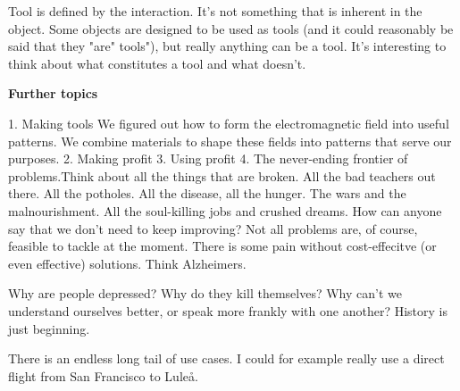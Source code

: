 \documentclass[12pt]{article}  %
\begin{document}
Tool is defined by the interaction. It's not something that is inherent in the object. Some objects are designed to be used as tools (and it could reasonably be said that they "are" tools"), but really anything can be a tool. It's interesting to think about what constitutes a tool and what doesn't. 

\textbf{Further topics}

1. Making tools
We figured out how to form the electromagnetic field into useful patterns. We combine materials to shape these fields into patterns that serve our purposes.
2. Making profit
3. Using profit
4. The never-ending frontier of problems.Think about all the things that are broken. All the bad teachers out there. All the potholes. All the disease, all the hunger. The wars and the malnourishment. All the soul-killing jobs and crushed dreams. How can anyone say that we don't need to keep improving? Not all problems are, of course, feasible to tackle at the moment. There is some pain without cost-effecitve (or even effective) solutions. Think Alzheimers.

Why are people depressed? Why do they kill themselves? Why can't we understand ourselves better, or speak more frankly with one another? History is just beginning. 

There is an endless long tail of use cases. I could for example really use a direct flight from San Francisco to Luleå.
\end{document}
